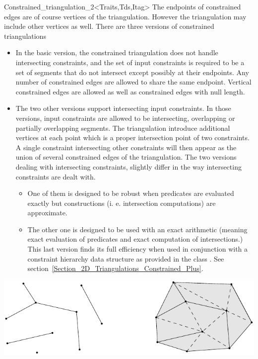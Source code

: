 \begin{ccRefClass}{Constrained_triangulation_2<Traits,Tds,Itag>}
The endpoints of constrained edges are of course vertices of the
triangulation. However the triangulation may include
other vertices as well.
There are three versions of  constrained triangulations
\begin{itemize}
\item
In the basic version, the constrained triangulation 
does not handle intersecting constraints, and the set of input 
constraints is required to be a set of segments that do not intersect
except possibly at their endpoints. Any number of constrained edges
are allowed to share the same endpoint.  Vertical constrained edges
are allowed as well as 
constrained edges with null length.
\item
The two other versions support intersecting input constraints.
In those versions, input constraints are allowed to be
intersecting, overlapping or partially
overlapping segments.
The triangulation introduce  additional  vertices at each point which
is a proper intersection point of  two 
constraints. A single constraint intersecting other
constraints will then appear as the union of several 
constrained edges of  the triangulation.
The two versions dealing with intersecting constraints, slightly differ
in the way intersecting constraints are dealt with.
\begin{itemize}
\item  One of them is
designed to be robust when predicates are evaluated exactly but
constructions (i. e.  intersection computations) are
approximate.
\item
The other one is designed to be used 
with an exact arithmetic (meaning exact
evaluation of predicates and exact computation of intersections.)
This last version finds its full efficiency  when used in conjunction
with a constraint hierarchy data structure 
as provided in the class
. See
section~\ref{Section_2D_Triangulations_Constrained_Plus}.
\end{itemize}
\end{itemize}



\begin{ccTexOnly}
\begin{center} \includegraphics[scale=0.5]{Triangulation_2/constraints} \end{center}
\end{ccTexOnly}


\end{ccRefClass}
